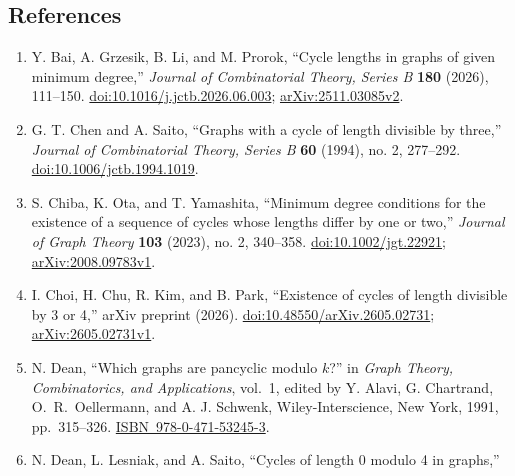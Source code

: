 \documentclass[
  11pt]{article}
\let\papersection\subsection
\renewcommand{\subsection}{\Needspace{10\baselineskip}\papersection}
\begin{document}
\newpage

\subsection{References}\label{references}

\begingroup
\raggedright

\begin{enumerate}
\def\labelenumi{\arabic{enumi}.}
\item
  \label{ref-bglp-2026}{}Y. Bai, A. Grzesik, B. Li, and
  M. Prorok, ``Cycle lengths in graphs of given minimum degree,''
  \emph{Journal of Combinatorial Theory, Series B} \textbf{180} (2026),
  111--150.
  \href{https://doi.org/10.1016/j.jctb.2026.06.003}{doi:10.1016/j.jctb.2026.06.003};
  \href{https://arxiv.org/abs/2511.03085v2}{arXiv:2511.03085v2}.
\item
  \label{ref-chen-saito-1994}{}G. T. Chen and A. Saito,
  ``Graphs with a cycle of length divisible by three,'' \emph{Journal of
  Combinatorial Theory, Series B} \textbf{60} (1994), no. 2, 277--292.
  \href{https://doi.org/10.1006/jctb.1994.1019}{doi:10.1006/jctb.1994.1019}.
\item
  \label{ref-chiba-ota-yamashita-2023}{}S. Chiba, K. Ota,
  and T. Yamashita, ``Minimum degree conditions for the existence of a
  sequence of cycles whose lengths differ by one or two,'' \emph{Journal
  of Graph Theory} \textbf{103} (2023), no. 2, 340--358.
  \href{https://doi.org/10.1002/jgt.22921}{doi:10.1002/jgt.22921};
  \href{https://arxiv.org/abs/2008.09783v1}{arXiv:2008.09783v1}.
\item
  \label{ref-choi-chu-kim-park-2026}{}I. Choi, H. Chu, R.
  Kim, and B. Park, ``Existence of cycles of length divisible by 3 or
  4,'' arXiv preprint (2026).
  \href{https://doi.org/10.48550/arXiv.2605.02731}{doi:10.48550/arXiv.2605.02731};
  \href{https://arxiv.org/abs/2605.02731v1}{arXiv:2605.02731v1}.
\item
  \label{ref-dean-1991}{}N. Dean, ``Which graphs are
  pancyclic modulo \(k\)?'' in \emph{Graph Theory, Combinatorics, and
  Applications}, vol.~1, edited by Y. Alavi, G. Chartrand,
  \mbox{O. R. Oellermann}, and A. J. Schwenk, Wiley-Interscience, New
  York, 1991, pp.~315--326.
  \href{https://archive.org/details/graphtheorycombi0000inte}{\mbox{ISBN 978-0-471-53245-3}}.
\item
  \label{ref-dean-lesniak-saito-1993}{}N. Dean, L.
  Lesniak, and A. Saito, ``Cycles of length 0 modulo 4 in graphs,''

\end{enumerate}
\end{document}
